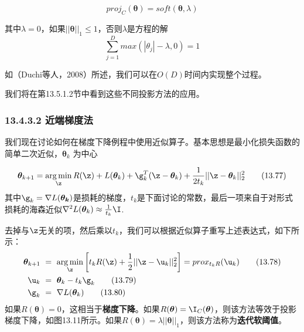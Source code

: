 \documentclass[a4paper]{article}
\DeclareMathOperator*{\argmin}{arg\,min}
\begin{document}
\begin{equation}
	proj_C(\boldsymbol{\theta})=soft(\boldsymbol{\theta},\lambda)\tag{13.75}
\end{equation}

其中$\lambda=0$，如果$||\boldsymbol{\theta}||_1\le 1$，否则$\lambda$是方程的解
\begin{equation}
	\sum_{j=1}^{D}max(|\theta_j|-\lambda,0)=1\tag{13.76}
\end{equation}

如（Duchi等人，2008）所述，我们可以在$O(D)$时间内实现整个过程。

我们将在第13.5.1.2节中看到这些不同投影方法的应用。

\subsubsection*{13.4.3.2  近端梯度法}

我们现在讨论如何在梯度下降例程中使用近似算子。基本思想是最小化损失函数的简单二次近似，$\boldsymbol{\theta}_k$ 为中心

\begin{equation}
\boldsymbol{\theta}_{k+1}=\argmin_\z  R(\z)+L(\boldsymbol{\theta}_k)+\g_k^T(\z -\boldsymbol{\theta}_k)+\frac{1}{2t_k}||\z -\boldsymbol{\theta}_k||_2^2\tag{13.77}
\end{equation}
其中$\g_k=\nabla L(\boldsymbol{\theta_k})$是损耗的梯度，$t_k$是下面讨论的常数，最后一项来自于对形式损耗的海森近似$\nabla^2L(\boldsymbol{\theta}_k)\approx \frac{1}{t_k}\I$.

去掉与$\z$无关的项，然后乘以$t_k$，我们可以根据近似算子重写上述表达式，如下所示：
\begin{align}
\boldsymbol{\theta}_{k+1}\ &=\ \argmin_\z \left[t_k R(\z)+\frac{1}{2}||\z-\u_k||_2^2\right]=prox_{t_kR}(\u_k)\tag{13.78}\\
\u_k\ &=\ \boldsymbol{\theta}_{k}-t_k\g_k\tag{13.79}\\
\g_k\ &=\ \nabla L(\boldsymbol{\theta}_k)\tag{13.80}
\end{align}
如果$R(\boldsymbol{\theta})=0$，这相当于\textbf{梯度下降}。如果$R(\boldsymbol{\theta})=\I_C(\boldsymbol{\theta})$，则该方法等效于投影梯度下降，如图13.11所示。如果$R(\boldsymbol{\theta})=\lambda||\boldsymbol{\theta}||_1$，则该方法称为\textbf{迭代软阈值}。
\end{document}
